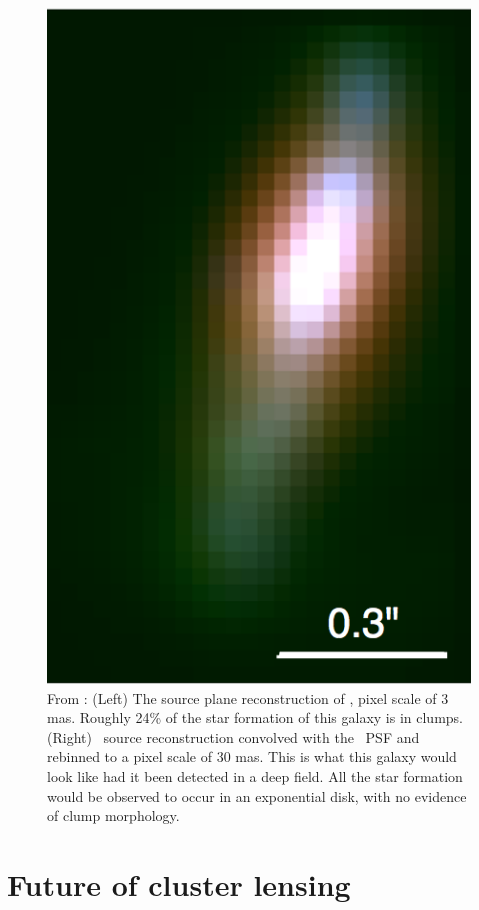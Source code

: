\begin{figure}
\includegraphics[height=0.4\textheight]{Conclusion/candelized_lowres.png}
\caption[Comparison of lensed \giantarc\ source reconstruction to its unlensed deep field realization]{From \citet{Rigby:2017qy}: (Left) The source plane reconstruction of \giantarc, pixel scale of 3 mas. Roughly 24\% of the star formation of this galaxy is in clumps. (Right) \giantarc\ source reconstruction convolved with the \hst\ PSF and rebinned to a pixel scale of 30 mas. This is what this galaxy would look like had it been detected in a deep field. All the star formation would be observed to occur in an exponential disk, with no evidence of clump morphology.}
\label{conc:fig:candelized}
\end{figure}

\section{Future of cluster lensing}

